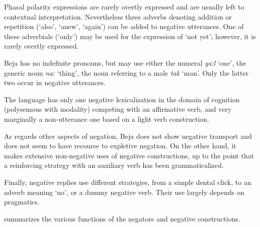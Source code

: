 \documentclass[output=paper,colorlinks,citecolor=brown]{langscibook}
\begin{document}
Phasal polarity expressions are rarely overtly expressed and are usually left to contextual interpretation. Nevertheless three adverbs denoting addition or repetition (‘also’, ‘anew’, ‘again’) can be added to negative utterances. One of these adverbials (‘only’) may be used for the expression of ‘not yet’; however, it is rarely overtly expressed.

Beja has no indefinite pronouns, but may use either the numeral \textit{gaːl} ‘one’, the generic noun \textit{naː} ‘thing’, the noun referring to a male \textit{tak} ‘man’. Only the latter two occur in negative utterances.

The language has only one negative lexicalization in the domain of cognition (polysemous with modality) competing with an affirmative verb, and very marginally a non-utterance one based on a light verb construction. 

As regards other aspects of negation, Beja does not show negative transport and does not seem to have recourse to expletive negation. On the other hand, it makes extensive non-negative uses of negative constructions, up to the point that a reinforcing strategy with an auxiliary verb has been grammaticalized.

Finally, negative replies use different strategies, from a simple dental click, to an adverb meaning ‘no’, or a dummy negative verb. Their use largely depends on pragmatics.

 summarizes the various functions of the negators and negative constructions.
\end{document}
